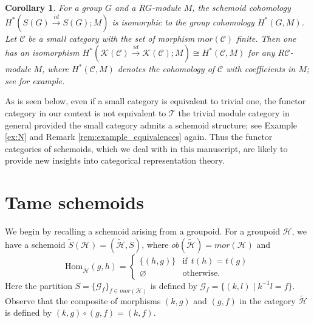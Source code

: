 \documentclass{amsart}
\newtheorem{cor}[thm]{Corollary}
\theoremstyle{definition}
\theoremstyle{remark}
\newcommand{\K}{R}%
\newcommand{\G}{{\mathcal G}}
\newcommand{\C}{{\mathcal C}}
\newcommand{\T}{{\mathcal T}}
\newcommand{\calK}{{\mathcal K}}
\begin{document}

\begin{cor}\label{cor:original_one}
 For a group $G$ and a $\K G$-module $M$, the schemoid cohomology   
$H^*( S(G) \stackrel{id}{\to} S(G) ; M)$ is isomorphic to the group cohomology $H^*(G, M)$. \\
 Let $\C$ be a small category with the set of morphism $mor(\C)$ finite. 
Then one has an isomorphism $H^*(\calK (\C) \stackrel{id}{\to} \calK(\C) ; M) \cong H^*(\C, M)$ for any $\K\C$-module 
$M$, where $H^*(\C, M)$ denotes the cohomology of $\C$ with coefficients in $M$; see \cite{B-W} for example. 
\end{cor}

As is seen below, even if a small category is equivalent to trivial one, 
the functor category in our context is not equivalent to $\T$ the trivial module category in general 
provided the small category admits a schemoid structure; see 
Example \ref{ex:N} and Remark \ref{rem:example_equivalences} again. 
Thus the functor categories of schemoids, which we deal with in this manuscript, 
are likely to provide new insights into categorical representation theory. 

\section{Tame schemoids}\label{Result}

We begin by recalling a schemoid arising from a groupoid. 
For a groupoid ${\mathcal H}$, we have 
a schemoid $\widetilde{S}({\mathcal H}) = (\widetilde{\mathcal H}, S)$, where $ob (\widetilde{\mathcal H}) = mor({\mathcal H})$ 
and 
$$
\text{Hom}_{\widetilde{{\mathcal H}}}(g, h) = \begin{cases}
\{(h, g)\}  & \text{if}  \ \  t(h) = t(g)  \\
\varnothing & \text{otherwise}. 
\end{cases}
$$
Here the partition $S=\{ \G_f \}_{f \in mor({\mathcal H})}$ is defined by $\G_f = \{(k, l) \mid k^{-1}l = f\}$. 
Observe that the composite of morphisms $(k, g)$ and $(g, f)$ in the category $\widetilde{\mathcal H}$ 
is defined by $(k, g)\circ (g, f) = (k, f)$. 
\end{document}
